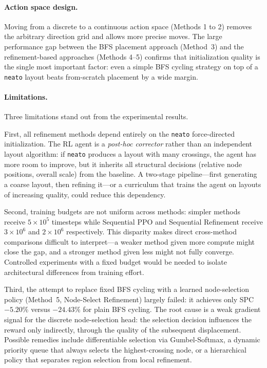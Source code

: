 \documentclass[10pt,twocolumn]{article}
\begin{document}
\paragraph{Action space design.}
Moving from a discrete to a continuous action space (Methods 1 to 2) removes
the arbitrary direction grid and allows more precise moves.  The large
performance gap between the BFS placement approach (Method~3)
and the refinement-based approaches (Methods 4--5) confirms that initialization
quality is the single most important factor: even a simple BFS cycling strategy
on top of a \texttt{neato} layout beats from-scratch placement by a wide margin.

\paragraph{Limitations.}
Three limitations stand out from the experimental results.

First, all refinement methods depend entirely on the \texttt{neato}
force-directed initialization.  The RL agent is a \emph{post-hoc corrector}
rather than an independent layout algorithm: if \texttt{neato} produces a
layout with many crossings, the agent has more room to improve, but it
inherits all structural decisions (relative node positions, overall scale)
from the baseline.  A two-stage pipeline---first generating a coarse layout,
then refining it---or a curriculum that trains the agent on layouts of
increasing quality, could reduce this dependency.

Second, training budgets are not uniform across methods: simpler methods
receive $5\times10^5$ timesteps while Sequential PPO and Sequential
Refinement receive $3\times10^6$ and $2\times10^6$ respectively.  This
disparity makes direct cross-method comparisons difficult to interpret---a
weaker method given more compute might close the gap, and a stronger method
given less might not fully converge.  Controlled experiments with a fixed
budget would be needed to isolate architectural differences from training
effort.

Third, the attempt to replace fixed BFS cycling with a learned node-selection
policy (Method~5, Node-Select Refinement) largely failed: it achieves only
SPC $-5.20\%$ versus $-24.43\%$ for plain BFS cycling.  The root cause is
a weak gradient signal for the discrete node-selection head: the selection
decision influences the reward only indirectly, through the quality of the
subsequent displacement.  Possible remedies include differentiable selection
via Gumbel-Softmax, a dynamic priority queue that always selects the
highest-crossing node, or a hierarchical policy that separates region
selection from local refinement.
\end{document}
